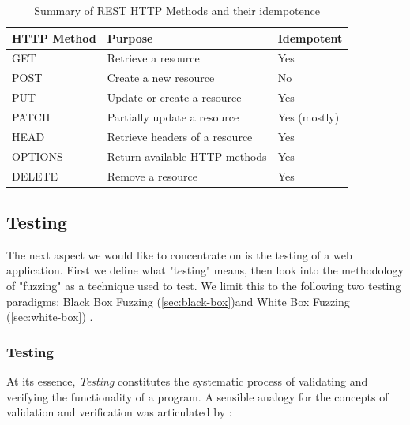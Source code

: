 \begin{table}[htb]
    \centering
    \begin{tabular}{@{}lll@{}}
        \toprule
        \textbf{HTTP Method} & \textbf{Purpose}                         & \textbf{Idempotent} \\ \midrule
        GET                   & Retrieve a resource                     & Yes                 \\
        POST                  & Create a new resource                   & No                  \\
        PUT                   & Update or create a resource             & Yes                 \\
        PATCH                 & Partially update a resource             & Yes (mostly)        \\
        HEAD                  & Retrieve headers of a resource         & Yes                 \\
        OPTIONS               & Return available HTTP methods           & Yes                 \\
        DELETE                & Remove a resource                       & Yes                 \\ \bottomrule
    \end{tabular}
    \caption[List of HTTP Methods]{Summary of REST HTTP Methods and their idempotence \cite[chapter 9]{fielding_http_2022}}
    \label{tab:rest_http_methods}
\end{table}
\FloatBarrier
\subsection{Testing}
\label{sec:testing}

The next aspect we would like to concentrate on is the testing of a web application. First we define what "testing" means, then look into the methodology of "fuzzing" as a technique used to test. We limit this to the following two testing paradigms:
Black Box Fuzzing (\autoref{sec:black-box})and White Box Fuzzing (\autoref{sec:white-box}) .

\subsubsection{Testing}
At its essence, \textit{Testing} constitutes the systematic process of validating and verifying the functionality of a program. A sensible analogy for the concepts of validation and verification was articulated by \citet{b_w_boehm_verifying_1984}:

